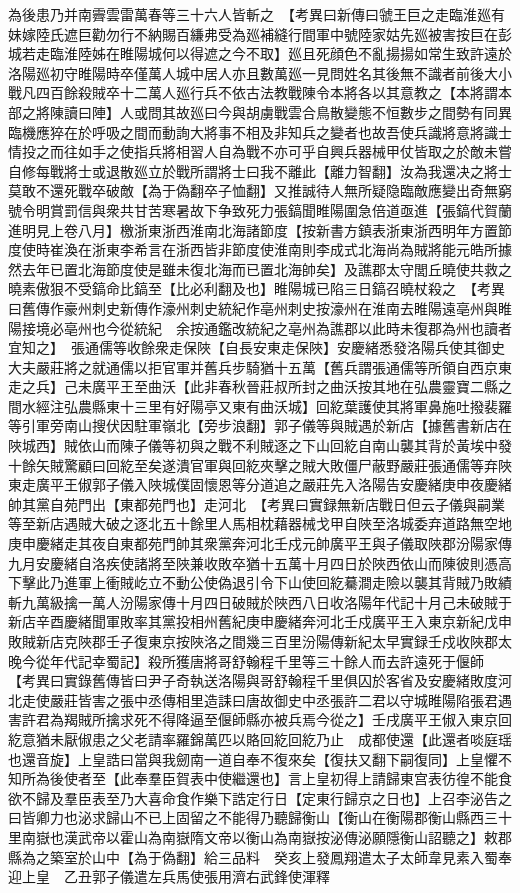 為後患乃并南霽雲雷萬春等三十六人皆斬之　【考異曰新傳曰虢王巨之走臨淮廵有妹嫁陸氏遮巨勸勿行不納賜百縑弗受為廵補縫行間軍中號陸家姑先廵被害按巨在彭城若走臨淮陸姊在睢陽城何以得遮之今不取】廵且死顔色不亂揚揚如常生致許遠於洛陽廵初守睢陽時卒僅萬人城中居人亦且數萬廵一見問姓名其後無不識者前後大小戰凡四百餘殺賊卒十二萬人廵行兵不依古法教戰陳令本將各以其意教之【本將謂本部之將陳讀曰陣】人或問其故廵曰今與胡虜戰雲合鳥散變態不恒數步之間勢有同異臨機應猝在於呼吸之間而動詢大將事不相及非知兵之變者也故吾使兵識將意將識士情投之而往如手之使指兵將相習人自為戰不亦可乎自興兵器械甲仗皆取之於敵未嘗自修每戰將士或退散廵立於戰所謂將士曰我不離此【離力智翻】汝為我還决之將士莫敢不還死戰卒破敵【為于偽翻卒子恤翻】又推誠待人無所疑隐臨敵應變出奇無窮號令明賞罰信與衆共甘苦寒暑故下争致死力張鎬聞睢陽圍急倍道亟進【張鎬代賀蘭進明見上卷八月】檄浙東浙西淮南北海諸節度【按新書方鎮表浙東浙西明年方置節度使時崔渙在浙東李希言在浙西皆非節度使淮南則李成式北海尚為賊將能元皓所據然去年已置北海節度使是雖未復北海而已置北海帥矣】及譙郡太守閭丘曉使共救之曉素傲狠不受鎬命比鎬至【比必利翻及也】睢陽城已陷三日鎬召曉杖殺之　【考異曰舊傳作豪州刺史新傳作濠州刺史統紀作亳州刺史按濠州在淮南去睢陽遠亳州與睢陽接境必亳州也今從統紀　余按通鑑改統紀之亳州為譙郡以此時未復郡為州也讀者宜知之】　張通儒等收餘衆走保陜【自長安東走保陜】安慶緒悉發洛陽兵使其御史大夫嚴莊將之就通儒以拒官軍并舊兵步騎猶十五萬【舊兵謂張通儒等所領自西京東走之兵】己未廣平王至曲沃【此非春秋晉莊叔所封之曲沃按其地在弘農靈寶二縣之間水經注弘農縣東十三里有好陽亭又東有曲沃城】回紇葉護使其將軍鼻施吐撥裴羅等引軍旁南山搜伏因駐軍嶺北【旁步浪翻】郭子儀等與賊遇於新店【據舊書新店在陜城西】賊依山而陳子儀等初與之戰不利賊逐之下山回紇自南山襲其背於黃埃中發十餘矢賊驚顧曰回紇至矣遂潰官軍與回紇夾擊之賊大敗僵尸蔽野嚴莊張通儒等弃陜東走廣平王俶郭子儀入陜城僕固懷恩等分道追之嚴莊先入洛陽告安慶緒庚申夜慶緒帥其黨自苑門出【東都苑門也】走河北　【考異曰實録無新店戰日但云子儀與嗣業等至新店遇賊大破之逐北五十餘里人馬相枕藉器械戈甲自陜至洛城委弃道路無空地庚申慶緒走其夜自東都苑門帥其衆黨奔河北壬戍元帥廣平王與子儀取陜郡汾陽家傳九月安慶緒自洛疾使諸將至陜兼收敗卒猶十五萬十月四日於陜西依山而陳彼則憑高下擊此乃進軍上衝賊屹立不動公使偽退引令下山使回紇驀澗走險以襲其背賊乃敗績斬九萬級擒一萬人汾陽家傳十月四日破賊於陜西八日收洛陽年代記十月己未破賊于新店辛酉慶緒聞軍敗率其黨投相州舊紀庚申慶緒奔河北壬戍廣平王入東京新紀戊申敗賊新店克陜郡壬子復東京按陜洛之間幾三百里汾陽傳新紀太早實録壬戍收陜郡太晚今從年代記幸蜀記】殺所獲唐將哥舒翰程千里等三十餘人而去許遠死于偃師　【考異曰實錄舊傳皆曰尹子奇執送洛陽與哥舒翰程千里俱囚於客省及安慶緒敗度河北走使嚴莊皆害之張中丞傳相里造誄曰唐故御史中丞張許二君以守城睢陽陷張君遇害許君為羯賊所擒求死不得降逼至偃師縣亦被兵焉今從之】壬戌廣平王俶入東京回紇意猶未厭俶患之父老請率羅錦萬匹以賂回紇回紇乃止　成都使還【此還者啖庭瑶也還音旋】上皇誥曰當與我劒南一道自奉不復來矣【復扶又翻下嗣復同】上皇懼不知所為後使者至【此奉羣臣賀表中使繼還也】言上皇初得上請歸東宫表彷徨不能食欲不歸及羣臣表至乃大喜命食作樂下誥定行日【定東行歸京之日也】上召李泌告之曰皆卿力也泌求歸山不已上固留之不能得乃聽歸衡山【衡山在衡陽郡衡山縣西三十里南嶽也漢武帝以霍山為南嶽隋文帝以衡山為南嶽按泌傳泌願隱衡山詔聽之】敕郡縣為之築室於山中【為于偽翻】給三品料　癸亥上發鳳翔遣太子太師韋見素入蜀奉迎上皇　乙丑郭子儀遣左兵馬使張用濟右武鋒使渾釋
